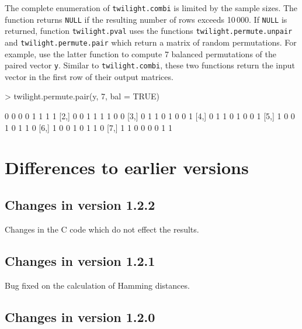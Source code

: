 \documentclass[11pt,a4paper,fleqn]{report}
\newcommand{\Rfunction}[1]{{\texttt{#1}}}
\newcommand{\Rfunarg}[1]{{\texttt{#1}}}
\begin{document}
The complete enumeration of \Rfunction{twilight.combi} is limited by the sample sizes. The function returns \Rfunarg{NULL} if the resulting number of rows exceeds 10\,000. If \Rfunarg{NULL} is returned, function \Rfunction{twilight.pval} uses the functions \Rfunction{twilight.permute.unpair} and \Rfunction{twilight.permute.pair} which return a matrix of random permutations. For example, use the latter function to compute 7 balanced permutations of the paired vector \Rfunarg{y}. Similar to \Rfunction{twilight.combi}, these two functions return the input vector in the first row of their output matrices.
\begin{Schunk}
\begin{Sinput}
> twilight.permute.pair(y, 7, bal = TRUE)
\end{Sinput}
\begin{Soutput}
     [,1] [,2] [,3] [,4] [,5] [,6] [,7] [,8]
[1,]    0    0    0    0    1    1    1    1
[2,]    0    0    1    1    1    1    0    0
[3,]    0    1    1    0    1    0    0    1
[4,]    0    1    1    0    1    0    0    1
[5,]    1    0    0    1    0    1    1    0
[6,]    1    0    0    1    0    1    1    0
[7,]    1    1    0    0    0    0    1    1
\end{Soutput}
\end{Schunk}




\chapter{Differences to earlier versions}


\section{Changes in version 1.2.2}

Changes in the C code which do not effect the results.


\section{Changes in version 1.2.1}

Bug fixed on the calculation of Hamming distances.


\section{Changes in version 1.2.0}
\end{document}
